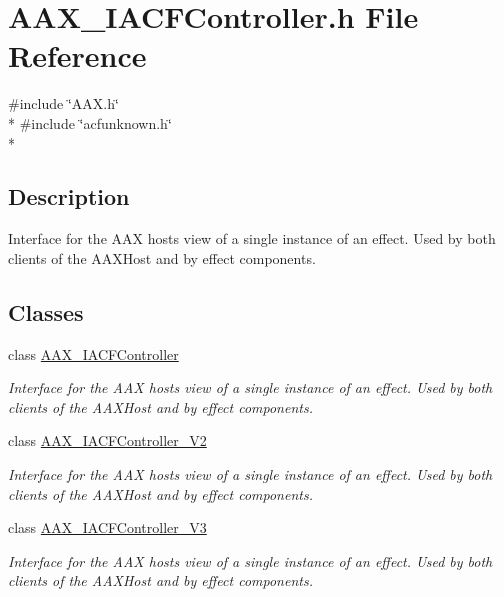 \hypertarget{a00219}{}\section{A\+A\+X\+\_\+\+I\+A\+C\+F\+Controller.\+h File Reference}
\label{a00219}
{\ttfamily \#include \char`\"{}A\+A\+X.\+h\char`\"{}}\\*
{\ttfamily \#include \char`\"{}acfunknown.\+h\char`\"{}}\\*


\subsection{Description}
Interface for the A\+A\+X host\textquotesingle{}s view of a single instance of an effect. Used by both clients of the A\+A\+X\+Host and by effect components. 

\subsection*{Classes}
\begin{DoxyCompactItemize}
\item 
class \hyperlink{a00053}{A\+A\+X\+\_\+\+I\+A\+C\+F\+Controller}
\begin{DoxyCompactList}\small\item\em Interface for the A\+A\+X host\textquotesingle{}s view of a single instance of an effect. Used by both clients of the A\+A\+X\+Host and by effect components. \end{DoxyCompactList}\item 
class \hyperlink{a00054}{A\+A\+X\+\_\+\+I\+A\+C\+F\+Controller\+\_\+\+V2}
\begin{DoxyCompactList}\small\item\em Interface for the A\+A\+X host\textquotesingle{}s view of a single instance of an effect. Used by both clients of the A\+A\+X\+Host and by effect components. \end{DoxyCompactList}\item 
class \hyperlink{a00055}{A\+A\+X\+\_\+\+I\+A\+C\+F\+Controller\+\_\+\+V3}
\begin{DoxyCompactList}\small\item\em Interface for the A\+A\+X host\textquotesingle{}s view of a single instance of an effect. Used by both clients of the A\+A\+X\+Host and by effect components. \end{DoxyCompactList}\end{DoxyCompactItemize}
